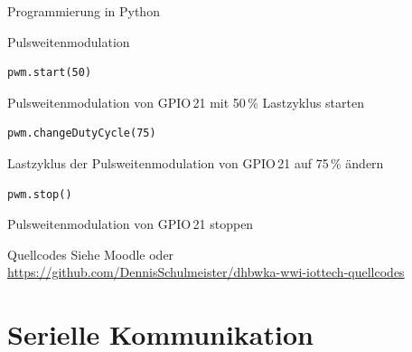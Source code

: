 {\begin{frame}{Programmierung in Python}
\begin{block}{Pulsweitenmodulation}
        \begin{lstlisting}[style=MethodenListe, gobble=12]
            pwm.start(50)
        \end{lstlisting}
        Pulsweitenmodulation von GPIO\,21 mit 50\,\% Lastzyklus starten
        \medskip

        \begin{lstlisting}[style=MethodenListe, gobble=12]
            pwm.changeDutyCycle(75)
        \end{lstlisting}
        Lastzyklus der Pulsweitenmodulation von GPIO\,21 auf 75\,\% ändern
        \medskip

        \begin{lstlisting}[style=MethodenListe, gobble=12]
            pwm.stop()
        \end{lstlisting}
        Pulsweitenmodulation von GPIO\,21 stoppen
        \medskip
    \end{block}
\end{frame}
}

\begin{frame}{Quellcodes}
    Siehe Moodle oder \\
    {
        \small
        \url{https://github.com/DennisSchulmeister/dhbwka-wwi-iottech-quellcodes}
    }

    \smallskip
    \setlength{\fboxsep}{0em}
\end{frame}

\section{Serielle Kommunikation}

